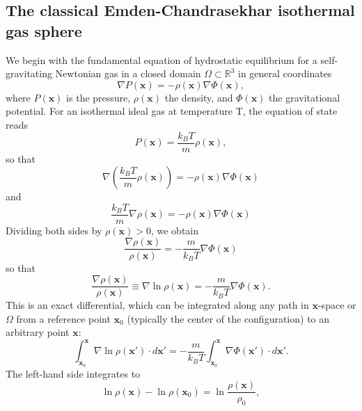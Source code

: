 \documentclass[12pt,a4paper]{article}
\numberwithin{equation}{section}
\begin{document}
\subsection{The classical Emden-Chandrasekhar isothermal gas sphere}
We begin with the fundamental equation of hydrostatic equilibrium for a self-gravitating Newtonian gas in a closed domain $\Omega\subset\mathbb{R}^{3}$ in general coordinates
\begin{equation}
\nabla P(\mathbf{x}) = - \rho(\mathbf{x}) \nabla \Phi(\mathbf{x}),
\end{equation}
where $P(\mathbf{x})$ is the pressure, $\rho(\mathbf{x})$ the density, and $\Phi(\mathbf{x})$ the gravitational potential. For an isothermal ideal gas at temperature T, the equation of state reads
\begin{equation}
P(\mathbf{x}) = \frac{k_B T}{m} \rho(\mathbf{x}),
\end{equation}
so that
\begin{equation}
\nabla \left( \frac{k_B T}{m} \rho(\mathbf{x}) \right) = - \rho(\mathbf{x}) \nabla \Phi(\mathbf{x})
\end{equation}
and
\begin{equation}
\frac{k_B T}{m} \nabla \rho(\mathbf{x}) = - \rho(\mathbf{x}) \nabla \Phi(\mathbf{x})
\end{equation}
Dividing both sides by $\rho(\mathbf{x}) > 0$, we obtain
\begin{equation}
\frac{\nabla \rho(\mathbf{x})}{\rho(\mathbf{x})} = - \frac{m}{k_B T} \nabla \Phi(\mathbf{x})
\end{equation}
so that
\begin{equation}
\frac{\nabla \rho(\mathbf{x})}{\rho(\mathbf{x})}\equiv \nabla \ln \rho(\mathbf{x}) = - \frac{m}{k_B T} \nabla \Phi(\mathbf{x}).
\end{equation}
This is an exact differential, which can be integrated along any path in $\mathbf{x}$-space or $\Omega$ from a reference point $\mathbf{x}_0$ (typically the center of the configuration) to an arbitrary point $\mathbf{x}$:
\begin{equation*}
\int_{\mathbf{x}_0}^{\mathbf{x}} \nabla \ln \rho(\mathbf{x}') \cdot d\mathbf{x}'
= - \frac{m}{k_B T} \int_{\mathbf{x}_0}^{\mathbf{x}} \nabla \Phi(\mathbf{x}') \cdot d\mathbf{x}'.
\end{equation*}
The left-hand side integrates to
\begin{equation*}
\ln \rho(\mathbf{x}) - \ln \rho(\mathbf{x}_0) = \ln \frac{\rho(\mathbf{x})}{\rho_0},
\end{equation*}
\end{document}

